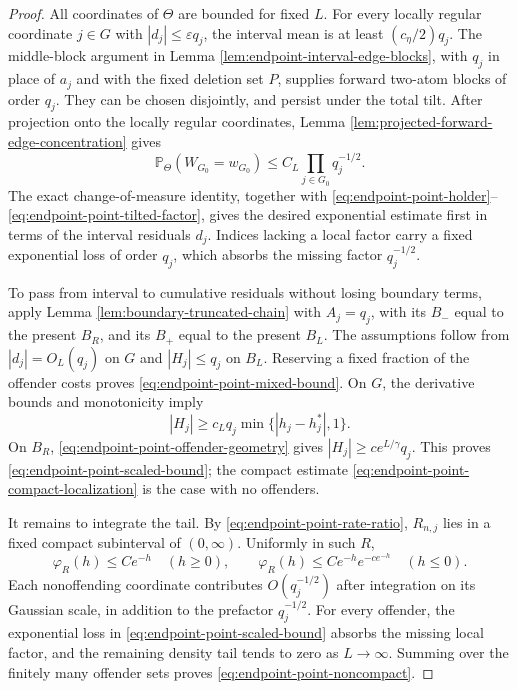 \documentclass[11pt]{article}
\theoremstyle{remark}
\newcommand{\Pp}{\mathbb P}
\begin{document}
\begin{proof}
All coordinates of $\Theta$ are bounded for fixed $L$.  For every locally
regular coordinate $j\in G$ with $|d_j|\le\varepsilon q_j$, the interval mean
is at least $(c_\eta/2)q_j$.  The middle-block argument in Lemma
\ref{lem:endpoint-interval-edge-blocks}, with $q_j$ in place of $a_j$ and with
the fixed deletion set $P$, supplies forward two-atom blocks of order $q_j$.
They can be chosen disjointly, and persist under the total tilt.  After
projection onto the locally regular coordinates, Lemma
\ref{lem:projected-forward-edge-concentration} gives
\[
        \Pp_\Theta(W_{G_0}=w_{G_0})
        \le C_L\prod_{j\in G_0}q_j^{-1/2}.
\tag{10.25}\label{eq:endpoint-point-tilted-factor}
\]
The exact change-of-measure identity, together with
\eqref{eq:endpoint-point-holder}--\eqref{eq:endpoint-point-tilted-factor},
gives the desired exponential estimate first in terms of the interval
residuals $d_j$.  Indices lacking a local factor carry a fixed exponential
loss of order $q_j$, which absorbs the missing factor $q_j^{-1/2}$.

To pass from interval to cumulative residuals without losing boundary terms,
apply Lemma \ref{lem:boundary-truncated-chain} with $A_j=q_j$, with its
$B_-$ equal to the present $B_R$, and its $B_+$ equal to the present $B_L$.
The assumptions follow from $|d_j|=O_L(q_j)$ on $G$ and
$|H_j|\le q_j$ on $B_L$.  Reserving a fixed fraction of the offender costs
proves \eqref{eq:endpoint-point-mixed-bound}.  On $G$, the derivative bounds
and monotonicity imply
\[
        |H_j|\ge c_Lq_j\min\{|h_j-h_j^*|,1\}.
\]
On $B_R$, \eqref{eq:endpoint-point-offender-geometry} gives
$|H_j|\ge ce^{L/\gamma}q_j$.  This proves
\eqref{eq:endpoint-point-scaled-bound}; the compact estimate
\eqref{eq:endpoint-point-compact-localization} is the case with no offenders.

It remains to integrate the tail.  By
\eqref{eq:endpoint-point-rate-ratio}, $R_{n,j}$ lies in a fixed compact
subinterval of $(0,\infty)$.  Uniformly in such $R$,
\[
        \varphi_R(h)\le Ce^{-h}\quad(h\ge0),
        \qquad
        \varphi_R(h)\le Ce^{-h}e^{-ce^{-h}}\quad(h\le0).
\tag{10.26}\label{eq:endpoint-point-density-tails}
\]
Each nonoffending coordinate contributes $O(q_j^{-1/2})$ after integration on
its Gaussian scale, in addition to the prefactor $q_j^{-1/2}$.  For every
offender, the exponential loss in \eqref{eq:endpoint-point-scaled-bound}
absorbs the missing local factor, and the remaining density tail tends to zero
as $L\to\infty$.  Summing over the finitely many offender sets proves
\eqref{eq:endpoint-point-noncompact}.
\end{proof}
\end{document}
